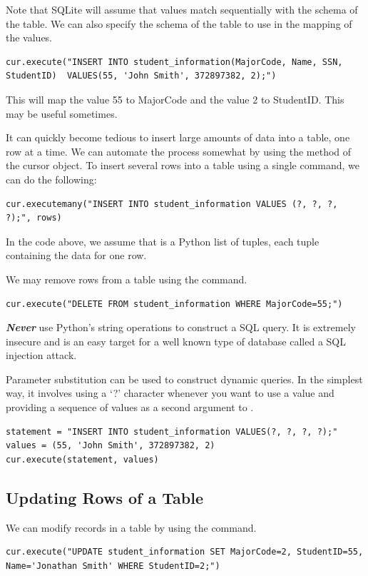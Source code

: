 Note that SQLite will assume that values match sequentially with the schema of the table.
We can also specify the schema of the table to use in the mapping of the values.
\begin{lstlisting}
cur.execute("INSERT INTO student_information(MajorCode, Name, SSN, StudentID)  VALUES(55, 'John Smith', 372897382, 2);")
\end{lstlisting}
This will map the value 55 to MajorCode and the value 2 to StudentID.  This may be useful sometimes.

It can quickly become tedious to insert large amounts of data into a table, one row at a time.
We can automate the process somewhat by using the  method of the cursor object.
To insert several rows into a table using a single command, we can do the following:
\begin{lstlisting}
cur.executemany("INSERT INTO student_information VALUES (?, ?, ?, ?);", rows)
\end{lstlisting}
In the code above, we assume that  is a Python list of tuples, each tuple containing the data for one
row.

We may remove rows from a table using the  command.
\begin{lstlisting}
cur.execute("DELETE FROM student_information WHERE MajorCode=55;")
\end{lstlisting}

\begin{warn}
\emph{\textbf{Never}} use Python's string operations to construct a SQL query.
It is extremely insecure and is an easy target for a well known type of database called a SQL injection attack.

Parameter substitution can be used to construct dynamic queries.
In the simplest way, it involves using a `?' character whenever you want to use a value and providing a
sequence of values as a second argument to .
\begin{lstlisting}
statement = "INSERT INTO student_information VALUES(?, ?, ?, ?);"
values = (55, 'John Smith', 372897382, 2)
cur.execute(statement, values)
\end{lstlisting}
\end{warn}

\subsection*{Updating Rows of a Table}
We can modify records in a table by using the  command.
\begin{lstlisting}
cur.execute("UPDATE student_information SET MajorCode=2, StudentID=55, Name='Jonathan Smith' WHERE StudentID=2;")
\end{lstlisting}


